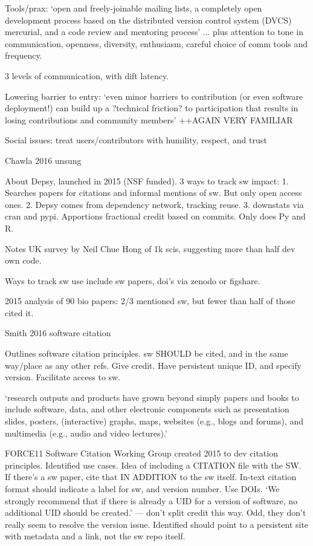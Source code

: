 \documentclass[12pt]{amsart}
\begin{document}
Tools/prax: `open and freely-joinable mailing lists, a completely open development process based on the distributed version control system (DVCS) mercurial, and a code review and mentoring process' ... plus attention to tone in communication, openness, diversity, enthusiasm, careful choice of comm tools and frequency. 

3 levels of communication, with dift latency.

Lowering barrier to entry: `even minor barriers to contribution (or even software deployment!) can build up a ?technical friction? to participation that results in losing contributions and community members' ++AGAIN VERY FAMILIAR

Social issues: treat users/contributors with humility, respect, and trust




Chawla 2016 unsung

About Depsy, launched in 2015 (NSF funded). 3 ways to track sw impact: 1. Searches papers for citations and informal mentions of sw. But only open access ones. 2. Depsy comes from dependency network, tracking reuse. 3. downstats via cran and pypi. Apportions fractional credit based on commits. Only does Py and R.

Notes UK survey by Neil Chue Hong of 1k scis, suggesting more than half dev own code. 

Ways to track sw use include sw papers, doi's via zenodo or figshare.

2015 analysis of 90 bio papers: 2/3 mentioned sw, but fewer than half of those cited it. 


Smith 2016 software citation

Outlines software citation principles. sw SHOULD be cited, and in the same way/place as any other refs. Give credit. Have persistent unique ID, and specify version. Facilitate access to sw.

`research outputs and products have grown beyond simply papers and books to include software, data, and other electronic components such as presentation slides, posters, (interactive) graphs, maps, websites (e.g., blogs and forums), and multimedia (e.g., audio and video lectures).'

FORCE11 Software Citation Working Group created 2015 to dev citation principles. Identified use cases. Idea of including a CITATION file with the SW. If there's a sw paper, cite that IN ADDITION to the sw itself. In-text citation format should indicate a label for sw, and version number. Use DOIs. `We strongly recommend that if there is already a UID for a version of software, no additional UID should be created.' --- don't split credit this way. Odd, they don't really seem to resolve the version issue. Identified should point to a persistent site with metadata and a link, not the sw repo itself.
\end{document}
